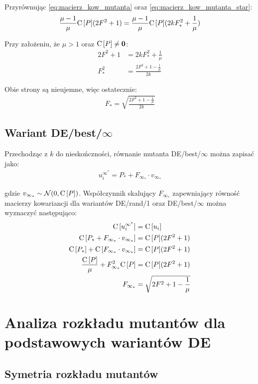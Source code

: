 \documentclass[a4paper,onecolumn,oneside,12pt,wide,floatssmall]{mwrep}
\def\C{{\rm C}\,}
\theoremstyle{definition}
\theoremstyle{plain}%
\theoremstyle{remark}
\begin{document}
Przyrównując \eqref{eq:macierz_kow_mutanta} oraz \eqref{eq:macierz_kow_mutanta_star}:
\begin{align*}
\frac{\mu - 1}{\mu}\C[P](2F^2 + 1) = \frac{\mu - 1}{\mu}\C[P](2kF_*^2 + \frac{1}{\mu})
\end{align*}

Przy założeniu, że $\mu > 1$ oraz $\C[P] \neq \textbf{0}$:
\begin{align*}
2F^2 + 1 &= 2kF_*^2 + \frac{1}{\mu} \\
F_*^2 &= \frac{2F^2 + 1 - \frac{1}{\mu}}{2k}
\end{align*}

Obie strony są nieujemne, więc ostatecznie:
\begin{align*}
F_* = \sqrt{\frac{2F^2 + 1 - \frac{1}{\mu}}{2k}}
\end{align*}

\subsection{Wariant DE/best/$\infty$}
\label{sub:de_rand_inf}

Przechodząc z $k$ do nieskończności, równanie mutanta DE/best/$\infty$ można zapisać jako:
\begin{align*}
u_i^{\infty^*} = P_* + F_{\infty_*} \cdot v_{\infty_*}
\end{align*}

gdzie $v_{\infty_*} \sim \mathcal{N}(0, \C[P])$. Współczynnik skalujący $F_{\infty_*}$ zapewniający
równość macierzy kowariancji dla wariantów DE/rand/1 oraz DE/best/$\infty$
można wyznaczyć następująco:
\begin{align*}
\C[u_i^{\infty^*}] &= \C[u_i] \\
\C[P_* + F_{\infty_*} \cdot v_{\infty_*}] &= \C[P](2F^2 + 1) \\
\C[P_*] + \C[F_{\infty_*} \cdot v_{\infty_*}] &= \C[P](2F^2 + 1) \\
\frac{\C[P]}{\mu} + F_{\infty_*}^2 \C[P] &= \C[P](2F^2 + 1) \\
F_{\infty_*} &= \sqrt{2F^2 + 1 - \frac{1}{\mu}}\\
\end{align*}

\section{Analiza rozkładu mutantów dla podstawowych wariantów DE}

\subsection{Symetria rozkładu mutantów}
\end{document}
